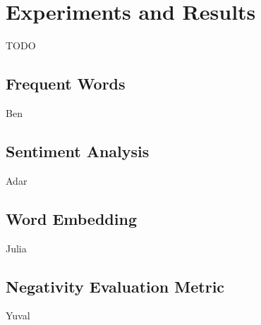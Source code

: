 \section{Experiments and Results}
TODO
\subsection{Frequent Words}
Ben
\subsection{Sentiment Analysis}
Adar
\subsection{Word Embedding}
Julia
\subsection{Negativity Evaluation Metric}
Yuval

